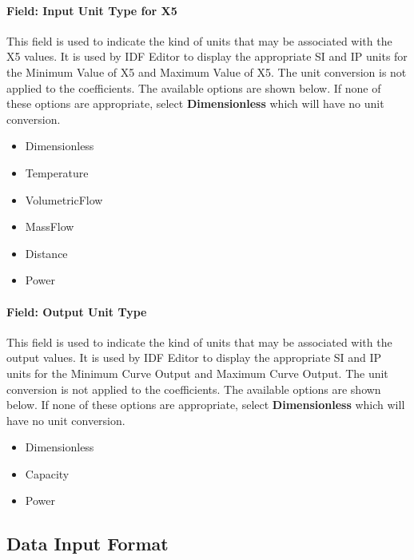 \paragraph{Field: Input Unit Type for X5}\label{field-input-unit-type-for-x5}

This field is used to indicate the kind of units that may be associated with the X5 values. It is used by IDF Editor to display the appropriate SI and IP units for the Minimum Value of X5 and Maximum Value of X5. The unit conversion is not applied to the coefficients. The available options are shown below. If none of these options are appropriate, select \textbf{Dimensionless} which will have no unit conversion.

\begin{itemize}
\item
  Dimensionless
\item
  Temperature
\item
  VolumetricFlow
\item
  MassFlow
\item
  Distance
\item
  Power
\end{itemize}

\paragraph{Field: Output Unit Type}\label{field-output-unit-type-2-000}

This field is used to indicate the kind of units that may be associated with the output values. It is used by IDF Editor to display the appropriate SI and IP units for the Minimum Curve Output and Maximum Curve Output. The unit conversion is not applied to the coefficients. The available options are shown below. If none of these options are appropriate, select \textbf{Dimensionless} which will have no unit conversion.

\begin{itemize}
\item
  Dimensionless
\item
  Capacity
\item
  Power
\end{itemize}

\subsection{Data Input Format}\label{data-input-format}

